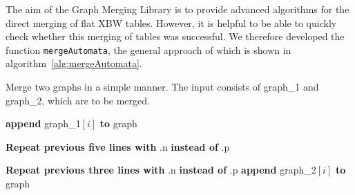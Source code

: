 \documentclass[a4paper,12pt,twoside,BCOR=10mm]{scrbook}
\begin{document}
The aim of the Graph Merging Library is to provide advanced algorithms 
for the direct merging of flat XBW tables. 
However, it is helpful to be able to quickly check whether this merging of tables 
was successful. 
We therefore developed the function \texttt{mergeAutomata}, 
the general approach of which is shown in algorithm~\ref{alg:mergeAutomata}. 
\begin{algorithm}
\caption[Merge two graphs]{Merge two graphs in a simple manner. The input consists of graph\_1 and graph\_2, which are to be merged.}
\label{alg:mergeAutomata}
\begin{algorithmic}[1]


\State \phantom{nl}

	\Else
		\State \textbf{append} graph\_1$[ i ]$ \textbf{to} graph
	\EndIf
\EndFor

\State \phantom{nl}

\EndFor

\State \phantom{nl}

		\EndIf
	\EndFor
	\State \textbf{Repeat previous five lines with} .n \textbf{instead of} .p
\EndFor

\State \phantom{nl}

	\EndFor
	\State \textbf{Repeat previous three lines with} .n \textbf{instead of} .p
	\State \textbf{append} graph\_2$[ i ]$ \textbf{to} graph
\EndFor


\end{algorithmic}
\end{algorithm}
\end{document}
